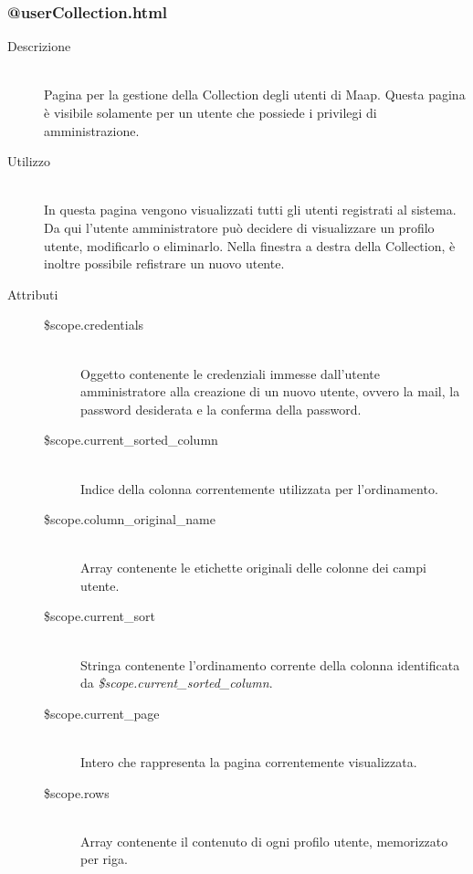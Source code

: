 \subsubsection{@userCollection.html}
\begin{description}
	\item[Descrizione] \hfill \\
	Pagina per la gestione della Collection degli utenti di Maap. Questa pagina è visibile solamente per un utente che possiede i privilegi di amministrazione.
	\item[Utilizzo] \hfill \\
	In questa pagina vengono visualizzati tutti gli utenti registrati al sistema. Da qui l'utente amministratore può decidere di visualizzare un profilo utente, modificarlo o eliminarlo. Nella finestra a destra della Collection, è inoltre possibile refistrare un nuovo utente.
	\item[Attributi] \hfill
	\begin{description}
		\item[\$scope.credentials] \hfill \\
		Oggetto contenente le credenziali immesse dall'utente amministratore alla creazione di un nuovo utente, ovvero la mail, la password desiderata e la conferma della password.
		\item[\$scope.current\_sorted\_column] \hfill \\
 		Indice della colonna correntemente utilizzata per l'ordinamento.
 		\item[\$scope.column\_original\_name] \hfill \\
		Array contenente le etichette originali delle colonne dei campi utente.
		\item[\$scope.current\_sort] \hfill \\
		Stringa contenente l'ordinamento corrente della colonna identificata da \textit{\$scope.current\_sorted\_column}.
		\item[\$scope.current\_page] \hfill \\
		Intero che rappresenta la pagina correntemente visualizzata.
		\item[\$scope.rows] \hfill \\
		Array contenente il contenuto di ogni profilo utente, memorizzato per riga.
	\end{description}
\end{description}

